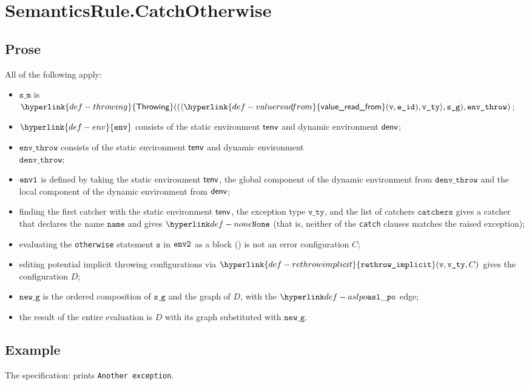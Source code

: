\documentclass{book}
\newcommand\ErrorConfig[0]{\hyperlink{def-errorconfig}{\texttt{\#DE}}}
\newcommand\ProseOrError[0]{\ProseTerminateAs{\ErrorConfig}}
\newcommand\rethrowimplicit[0]{\hyperlink{def-rethrowimplicit}{\texttt{rethrow\_implicit}}}
\newcommand\valuereadfrom[0]{\hyperlink{def-valuereadfrom}{\textsf{value\_read\_from}}}
\newcommand\Throwing[0]{\hyperlink{def-throwing}{\textsf{Throwing}}}
\newcommand\env[0]{\hyperlink{def-env}{\texttt{env}}}
\newcommand\newg[0]{\texttt{new\_g}}
\newcommand\vs[0]{\texttt{s}}
\newcommand\name[0]{\texttt{name}}
\newcommand\catchers[0]{\texttt{catchers}}
\newcommand\envthrow[0]{\texttt{env\_throw}}
\newcommand\denvthrow[0]{\texttt{denv\_throw}}
\newcommand\sm[0]{\texttt{s\_m}}
\newcommand\sg[0]{\texttt{s\_g}}
\newcommand\vvty[0]{\texttt{v\_ty}}
\newcommand\eid[0]{\texttt{e\_id}}
\begin{document}
\section{SemanticsRule.CatchOtherwise \label{sec:SemanticsRule.CatchOtherwise}}
  \subsection{Prose}
  All of the following apply:
  \begin{itemize}
    \item $\sm$ is $\Throwing((\langle \valuereadfrom(\vv, \eid), \vvty \rangle, \sg), \envthrow)$;
    \item $\env$ consists of the static environment $\textsf{tenv}$ and dynamic environment $\textsf{denv}$;
    \item $\envthrow$ consists of the static environment $\textsf{tenv}$ and dynamic environment \\ $\denvthrow$;
    \item $\texttt{env1}$ is defined by taking the static environment $\textsf{tenv}$, the global component of the dynamic
    environment from $\denvthrow$ and the local component of the dynamic environment from $\textsf{denv}$;
    \item finding the first catcher with the static environment $\textsf{tenv}$, the exception type $\vvty$,
    and the list of catchers $\catchers$ gives a catcher that declares the name $\name$ and gives $\None$
    (that is, neither of the \texttt{catch} clauses matches the raised exception);
    \item evaluating the \texttt{otherwise} statement $\vs$ in $\texttt{env2}$ as a block ()
    is not an error configuration $C$\ProseOrError;
    \item editing potential implicit throwing configurations via $\rethrowimplicit(\vv, \vvty, C)$
    gives the configuration $D$;
    \item $\newg$ is the ordered composition of $\sg$ and the graph of $D$,
    with the $\aslpo$ edge;
    \item the result of the entire evaluation is $D$ with its graph substituted with $\newg$.
  \end{itemize}

    \subsection{Example}
     The specification:
     prints \texttt{Another exception}.
\end{document}
